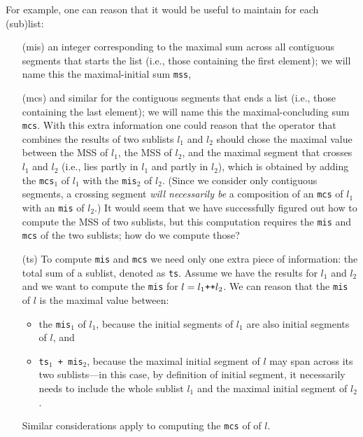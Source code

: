 \documentclass[acmsmall,review]{acmart}\settopmatter{printfolios=true,printccs=false,printacmref=false}
\begin{document}
For example, one can reason that it would be useful to maintain
for each (sub)list:
\begin{itemize}
    \item[(mis)] an integer corresponding to the maximal 
        sum across all contiguous segments that starts the 
        list (i.e., those containing the first element);
        we will name this the maximal-initial sum {\tt mss}, 
    \item[(mcs)] and similar for the contiguous segments that 
        ends a list (i.e., those containing the last element);
        we will name this the maximal-concluding sum {\tt mcs}.
        With this extra information one could reason that
        the operator that combines the results of two sublists 
        $l_1$ and $l_2$ should chose the maximal value between 
        the MSS of $l_1$, the MSS of $l_2$, and the maximal
        segment that crosses $l_1$ and $l_2$ (i.e., lies partly 
        in $l_1$ and partly in $l_2$), which is obtained
        by adding the {\tt mcs$_1$} of $l_1$ with the 
        {\tt mis$_2$} of $l_2$.
        (Since we consider only contiguous segments, a crossing 
         segment \emph{will necessarily be} a composition of an
         {\tt mcs} of $l_1$ with an {\tt mis} of $l_2$.)
        It would seem that we have successfully figured out
        how to compute the MSS of two sublists, but this
        computation requires the {\tt mis} and {\tt mcs}
        of the two sublists; how do we compute those?

    \item[(ts)] To compute {\tt mis} and {\tt mcs} we need only
        one extra piece of information: the total sum of a
        sublist, denoted as {\tt ts}. Assume we have the
        results for $l_1$ and $l_2$ and we want to compute
        the {\tt mis} for $l = l_1 \mbox{\tt++} l_2$.
        We can reason that the {\tt mis} of $l$ is the maximal
        value between:
        \begin{itemize}
            \item the {\tt mis$_1$} of $l_1$, because the initial
            segments of $l_1$ are also initial segments of $l$, and
            \item {\tt ts$_1$ + mis$_2$}, because the maximal
            initial segment of $l$ may span across its two sublists---in
            this case, by definition of initial segment, it necessarily 
            needs to include the whole sublist $l_1$ and the maximal 
            initial segment of $l_2$.
        \end{itemize}
        Similar considerations apply to computing the {\tt mcs} of
        of $l$. 
\end{itemize}
\end{document}
